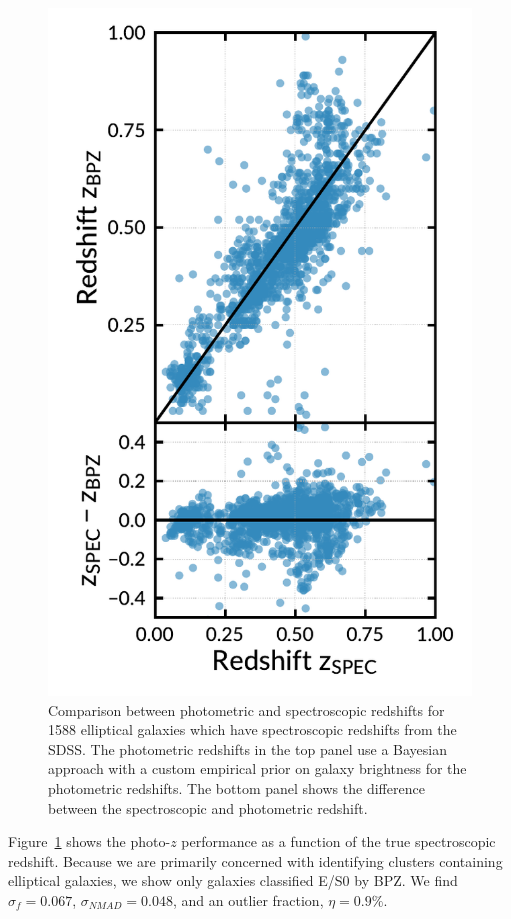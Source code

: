 \documentclass[apj, revtex4-1]{emulateapj}
\begin{document}
\begin{figure}
	\includegraphics[width=\columnwidth]{figures/specVSphot.pdf}
	\caption{Comparison between photometric and spectroscopic redshifts for 1588 elliptical galaxies which have spectroscopic redshifts from the SDSS. The photometric redshifts in the top panel use a Bayesian approach with a custom empirical prior on galaxy brightness for the photometric redshifts. The bottom panel shows the difference between the spectroscopic and photometric redshift.}
	\label{fig:photozspecz}
\end{figure}

Figure~\ref{fig:photozspecz} shows the photo-$z$ performance as a function of the true spectroscopic redshift. Because we are primarily concerned with identifying clusters containing elliptical galaxies, we show only galaxies classified E/S0 by BPZ. We find $\sigma_f = 0.067$, $\sigma_{NMAD} = 0.048$, and an outlier fraction, $\eta = 0.9\%$.
\end{document}
